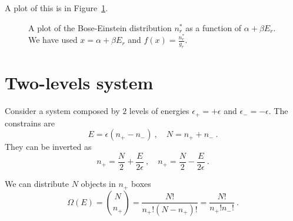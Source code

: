     A plot of this is in Figure~\ref{en:be}.
    \begin{figure}
        \centering
        \caption{A plot of the Bose-Einstein distribution $n_r^*$ as a function of $\alpha + \beta E_r$. We have used $x = \alpha + \beta E_r $ and $f(x) = \frac{n_r^*}{g_r}$.}
        \label{en:be}
    \end{figure}

\section{Two-levels system}

    Consider a system composed by $2$ levels of energies $\epsilon_+ = + \epsilon$ and $\epsilon_- = - \epsilon$. The constrains are 
    \begin{equation*}
        E = \epsilon (n_+ - n_-) ~, \quad N = n_+ + n_- ~.
    \end{equation*}
    They can be inverted as
    \begin{equation}
        n_+ = \frac{N}{2} + \frac{E}{2\epsilon} ~, \quad n_+ = \frac{N}{2} - \frac{E}{2\epsilon} ~.
    \end{equation}

    We can distribute $N$ objects in $n_+$ boxes
    \begin{equation*}
        \Omega(E) = \binom{N}{n_+} = \frac{N!}{n_+! (N - n_+)!}  = \frac{N!}{n_+! n_-!} ~.
    \end{equation*}
    
